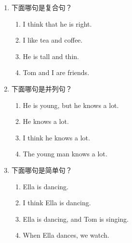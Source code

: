 \documentclass[11pt,a4paper]{ctexart}
\begin{document}
\begin{enumerate}[leftmargin=*,itemsep=4pt]
\begin{enumerate}[label=\Alph*.,leftmargin=2em,itemsep=1pt,topsep=2pt]
\end{enumerate}
\item 下面哪句是复合句？
\begin{enumerate}[label=\Alph*.,leftmargin=2em,itemsep=1pt,topsep=2pt]
\item I think that he is right.
\item I like tea and coffee.
\item He is tall and thin.
\item Tom and I are friends.
\end{enumerate}
\item 下面哪句是并列句？
\begin{enumerate}[label=\Alph*.,leftmargin=2em,itemsep=1pt,topsep=2pt]
\item He is young, but he knows a lot.
\item He knows a lot.
\item I think he knows a lot.
\item The young man knows a lot.
\end{enumerate}
\item 下面哪句是简单句？
\begin{enumerate}[label=\Alph*.,leftmargin=2em,itemsep=1pt,topsep=2pt]
\item Ella is dancing.
\item I think Ella is dancing.
\item Ella is dancing, and Tom is singing.
\item When Ella dances, we watch.
\end{enumerate}
\end{enumerate}
\end{document}
